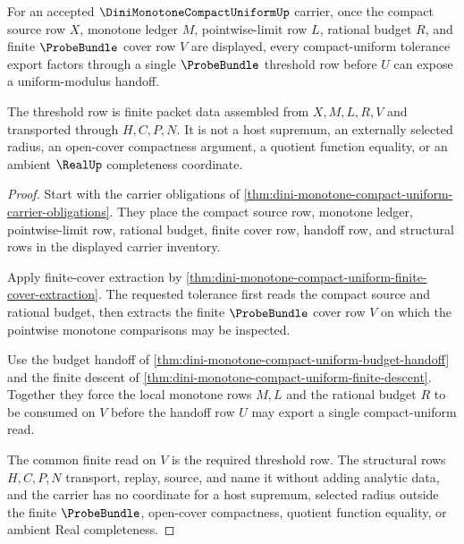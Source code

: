 \begin{theorem}
\label{thm:dini-monotone-compact-uniform-probebundle-threshold}
For an accepted $\DiniMonotoneCompactUniformUp$ carrier, once the compact source row $X$, monotone ledger $M$, pointwise-limit row $L$, rational budget $R$, and finite $\ProbeBundle$ cover row $V$ are displayed, every compact-uniform tolerance export factors through a single $\ProbeBundle$ threshold row before $U$ can expose a uniform-modulus handoff.

The threshold row is finite packet data assembled from $X,M,L,R,V$ and transported through $H,C,P,N$. It is not a host supremum, an externally selected radius, an open-cover compactness argument, a quotient function equality, or an ambient $\RealUp$ completeness coordinate.
\end{theorem}
\begin{proof}
Start with the carrier obligations of \autoref{thm:dini-monotone-compact-uniform-carrier-obligations}. They place the compact source row, monotone ledger, pointwise-limit row, rational budget, finite cover row, handoff row, and structural rows in the displayed carrier inventory.

Apply finite-cover extraction by \autoref{thm:dini-monotone-compact-uniform-finite-cover-extraction}. The requested tolerance first reads the compact source and rational budget, then extracts the finite $\ProbeBundle$ cover row $V$ on which the pointwise monotone comparisons may be inspected.

Use the budget handoff of \autoref{thm:dini-monotone-compact-uniform-budget-handoff} and the finite descent of \autoref{thm:dini-monotone-compact-uniform-finite-descent}. Together they force the local monotone rows $M,L$ and the rational budget $R$ to be consumed on $V$ before the handoff row $U$ may export a single compact-uniform read.

The common finite read on $V$ is the required threshold row. The structural rows $H,C,P,N$ transport, replay, source, and name it without adding analytic data, and the carrier has no coordinate for a host supremum, selected radius outside the finite $\ProbeBundle$, open-cover compactness, quotient function equality, or ambient Real completeness.
\end{proof}


